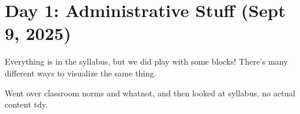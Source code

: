 \section{Day 1: Administrative Stuff (Sept 9, 2025)}

Everything is in the syllabus, but we did play with some blocks! There's many different ways to visualize the same thing.

\noindent Went over classroom norms and whatnot, and then looked at syllabus, no actual content tdy.
